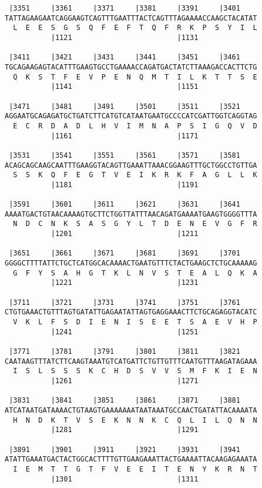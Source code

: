\documentclass{article}
\begin{document}
\begin{Verbatim}
 |3351     |3361     |3371     |3381     |3391     |3401    
TATTAGAAGAATCAGGAAGTCAGTTTGAATTTACTCAGTTTAGAAAACCAAGCTACATAT
  L  E  E  S  G  S  Q  F  E  F  T  Q  F  R  K  P  S  Y  I  L
           |1121                         |1131              
  
 |3411     |3421     |3431     |3441     |3451     |3461    
TGCAGAAGAGTACATTTGAAGTGCCTGAAAACCAGATGACTATCTTAAAGACCACTTCTG
  Q  K  S  T  F  E  V  P  E  N  Q  M  T  I  L  K  T  T  S  E
           |1141                         |1151              
  
 |3471     |3481     |3491     |3501     |3511     |3521    
AGGAATGCAGAGATGCTGATCTTCATGTCATAATGAATGCCCCATCGATTGGTCAGGTAG
  E  C  R  D  A  D  L  H  V  I  M  N  A  P  S  I  G  Q  V  D
           |1161                         |1171              
  
 |3531     |3541     |3551     |3561     |3571     |3581    
ACAGCAGCAAGCAATTTGAAGGTACAGTTGAAATTAAACGGAAGTTTGCTGGCCTGTTGA
  S  S  K  Q  F  E  G  T  V  E  I  K  R  K  F  A  G  L  L  K
           |1181                         |1191              
  
 |3591     |3601     |3611     |3621     |3631     |3641    
AAAATGACTGTAACAAAAGTGCTTCTGGTTATTTAACAGATGAAAATGAAGTGGGGTTTA
  N  D  C  N  K  S  A  S  G  Y  L  T  D  E  N  E  V  G  F  R
           |1201                         |1211              
  
 |3651     |3661     |3671     |3681     |3691     |3701    
GGGGCTTTTATTCTGCTCATGGCACAAAACTGAATGTTTCTACTGAAGCTCTGCAAAAAG
  G  F  Y  S  A  H  G  T  K  L  N  V  S  T  E  A  L  Q  K  A
           |1221                         |1231              
  
 |3711     |3721     |3731     |3741     |3751     |3761    
CTGTGAAACTGTTTAGTGATATTGAGAATATTAGTGAGGAAACTTCTGCAGAGGTACATC
  V  K  L  F  S  D  I  E  N  I  S  E  E  T  S  A  E  V  H  P
           |1241                         |1251              
  
 |3771     |3781     |3791     |3801     |3811     |3821    
CAATAAGTTTATCTTCAAGTAAATGTCATGATTCTGTTGTTTCAATGTTTAAGATAGAAA
  I  S  L  S  S  S  K  C  H  D  S  V  V  S  M  F  K  I  E  N
           |1261                         |1271              
  
 |3831     |3841     |3851     |3861     |3871     |3881    
ATCATAATGATAAAACTGTAAGTGAAAAAAATAATAAATGCCAACTGATATTACAAAATA
  H  N  D  K  T  V  S  E  K  N  N  K  C  Q  L  I  L  Q  N  N
           |1281                         |1291              
  
 |3891     |3901     |3911     |3921     |3931     |3941    
ATATTGAAATGACTACTGGCACTTTTGTTGAAGAAATTACTGAAAATTACAAGAGAAATA
  I  E  M  T  T  G  T  F  V  E  E  I  T  E  N  Y  K  R  N  T
           |1301                         |1311              
  

\end{Verbatim}
\end{document}

